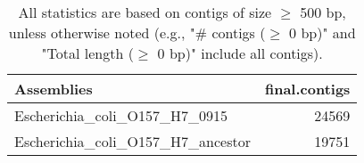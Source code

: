 \documentclass[12pt,a4paper]{article}
\begin{document}
\begin{table}[ht]
\begin{center}
\caption{All statistics are based on contigs of size $\geq$ 500 bp, unless otherwise noted (e.g., "\# contigs ($\geq$ 0 bp)" and "Total length ($\geq$ 0 bp)" include all contigs).}
\begin{tabular}{|l*{1}{|r}|}
\hline
Assemblies & final.contigs \\ \hline
Escherichia\_coli\_O157\_H7\_0915 & 24569 \\ \hline
Escherichia\_coli\_O157\_H7\_ancestor & 19751 \\ \hline
\end{tabular}
\end{center}
\end{table}
\end{document}
